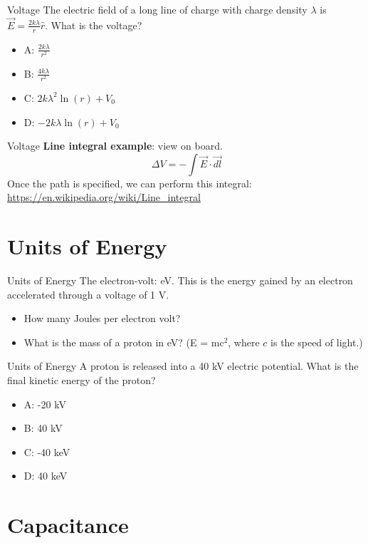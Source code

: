 \documentclass{beamer}
\begin{document}
\begin{frame}{Voltage}
The electric field of a long line of charge with charge density $\lambda$ is $\vec{E} = \frac{2k\lambda}{r}\hat{r}$.  What is the voltage?
\begin{itemize}
\item A: $\frac{2k\lambda}{r^2}$
\item B: $\frac{4k\lambda}{r^2}$
\item C: $2k\lambda^2\ln(r) + V_0$
\item D: $-2k\lambda\ln(r) + V_0$
\end{itemize}
\end{frame}

\begin{frame}{Voltage}
\textbf{Line integral example}: view on board.
\begin{equation}
\Delta V = -\int \vec{E} \cdot \vec{dl}
\end{equation}
Once the path is specified, we can perform this integral: \url{https://en.wikipedia.org/wiki/Line_integral}
\end{frame}

\section{Units of Energy}

\begin{frame}{Units of Energy}
The electron-volt: eV.  This is the energy gained by an electron accelerated through a voltage of 1 V.
\begin{itemize}
\item How many Joules per electron volt?
\item What is the mass of a proton in eV? (E = mc$^2$, where $c$ is the speed of light.)
\end{itemize}
\end{frame}

\begin{frame}{Units of Energy}
A proton is released into a 40 kV electric potential.  What is the final kinetic energy of the proton?
\begin{itemize}
\item A: -20 kV
\item B: 40 kV
\item C: -40 keV
\item D: 40 keV
\end{itemize}
\end{frame}

\section{Capacitance}
\end{document}
